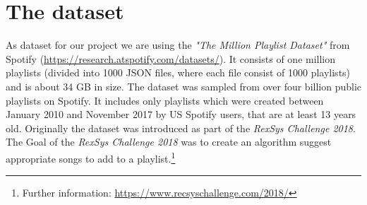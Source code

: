 \section{The dataset}

As dataset for our project we are using the \textit{"The Million Playlist Dataset"} \citet{recsysChallenge} from Spotify (\url{https://research.atspotify.com/datasets/}). It consists of one million playlists (divided into 1000 JSON files, where each file consist of 1000 playlists) and is about 34 GB in size. The dataset was sampled from over four billion public playlists on Spotify. It includes only playlists which were created between January 2010 and November 2017 by US Spotify users, that are at least 13 years old. Originally the dataset was introduced as part of the \textit{RexSys Challenge 2018}. The Goal of the \textit{RexSys Challenge 2018} was to create an algorithm suggest appropriate songs to add to a playlist.\footnote{Further information: \url{https://www.recsyschallenge.com/2018/}}




